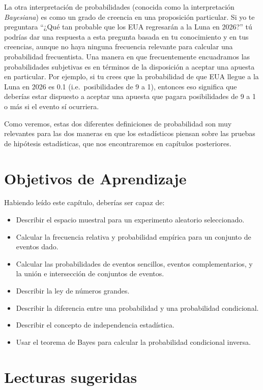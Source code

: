 \documentclass[
  12pt,
]{book}
\providecommand{\tightlist}{%
  \setlength{\itemsep}{0pt}\setlength{\parskip}{0pt}}
\begin{document}
La otra interpretación de probabilidades (conocida como la interpretación \emph{Bayesiana}) es como un grado de creencia en una proposición particular. Si yo te preguntara ``¿Qué tan probable que los EUA regresarán a la Luna en 2026?'' tú podrías dar una respuesta a esta pregunta basada en tu conocimiento y en tus creencias, aunque no haya ninguna frecuencia relevante para calcular una probabilidad frecuentista. Una manera en que frecuentemente encuadramos las probabilidades subjetivas es en términos de la disposición a aceptar una apuesta en particular. Por ejemplo, si tu crees que la probabilidad de que EUA llegue a la Luna en 2026 es 0.1 (i.e.~posibilidades de 9 a 1), entonces eso significa que deberías estar dispuesto a aceptar una apuesta que pagara posibilidades de 9 a 1 o más si el evento sí ocurriera.

Como veremos, estas dos diferentes definiciones de probabilidad son muy relevantes para las dos maneras en que los estadísticos piensan sobre las pruebas de hipótesis estadísticas, que nos encontraremos en capítulos posteriores.

\hypertarget{objetivos-de-aprendizaje}{%
\section{Objetivos de Aprendizaje}\label{objetivos-de-aprendizaje}}

Habiendo leído este capítulo, deberías ser capaz de:

\begin{itemize}
\tightlist
\item
  Describir el espacio muestral para un experimento aleatorio seleccionado.
\item
  Calcular la frecuencia relativa y probabilidad empírica para un conjunto de eventos dado.
\item
  Calcular las probabilidades de eventos sencillos, eventos complementarios, y la unión e intersección de conjuntos de eventos.
\item
  Describir la ley de números grandes.
\item
  Describir la diferencia entre una probabilidad y una probabilidad condicional.
\item
  Describir el concepto de independencia estadística.
\item
  Usar el teorema de Bayes para calcular la probabilidad condicional inversa.
\end{itemize}

\hypertarget{lecturas-sugeridas}{%
\section{Lecturas sugeridas}\label{lecturas-sugeridas}}
\end{document}
